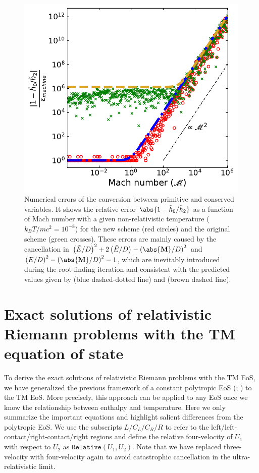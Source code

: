 \begin{figure}
\includegraphics[scale=0.8]{figures/ErrorMap3.pdf}
\caption{Numerical errors of the conversion between primitive and conserved variables. It shows the relative error $\abs{1-\tilde{h}_{0}/\tilde{h}_{2}}$ as a function of Mach number with a given non-relativistic temperature ($k_{B}T/mc^2=10^{-8}$) for the new scheme (red circles) and the original scheme (green crosses). These errors are mainly caused by the cancellation in $\left(\tilde{E}/D\right)^2+2\left(\tilde{E}/D\right)-\left(\abs{\mathbf{M}}/D\right)^2$ and $\left(E/D\right)^2-\left(\abs{\mathbf{M}}/D\right)^2-1$, which are inevitably introduced during the root-finding iteration and consistent with the predicted values given by  (blue dashed-dotted line) and (brown dashed line).}
\label{fig:ErrorAnalysis}
\end{figure}


\section{Exact solutions of relativistic Riemann problems with the TM equation of state}
\label{appendix:exact solution}
To derive the exact solutions of relativistic Riemann problems with the TM EoS, we have generalized the previous framework of a constant polytropic EoS (\citealt{Marti1994}; \citealt{REZZOLLA2001}) to the TM EoS. More precisely, this approach can be applied to any EoS once we know the relationship between enthalpy and temperature. Here we only summarize the important equations and highlight salient differences from the polytropic EoS. We use the subscripts $L/C_{L}/C_{R}/R$ to refer to the left/left-contact/right-contact/right regions and define the relative four-velocity of $U_{1}$ with respect to $U_{2}$ as $\texttt{Relative}(U_{1}, U_{2})$. Note that we have replaced three-velocity with four-velocity again to avoid catastrophic cancellation in the ultra-relativistic limit.

